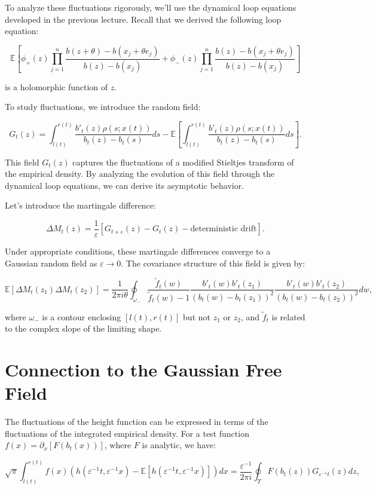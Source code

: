 \documentclass[letterpaper,11pt,oneside,reqno]{article}
\numberwithin{equation}{section}
\theoremstyle{definition}
\begin{document}
To analyze these fluctuations rigorously, we'll use the dynamical loop equations developed in the previous lecture. Recall that we derived the following loop equation:

$$\mathbb{E}\left[\phi_+(z) \prod_{j=1}^n \frac{b(z + \theta) - b(x_j + \theta e_j)}{b(z) - b(x_j)} + \phi_-(z) \prod_{j=1}^n \frac{b(z) - b(x_j + \theta e_j)}{b(z) - b(x_j)}\right]$$

is a holomorphic function of $z$.

To study fluctuations, we introduce the random field:

$$G_t(z) = \int_{l(t)}^{r(t)} \frac{b'_t(z)\rho(s; x(t))}{b_t(z) - b_t(s)}ds - \mathbb{E}\left[\int_{l(t)}^{r(t)} \frac{b'_t(z)\rho(s; x(t))}{b_t(z) - b_t(s)}ds\right].$$

This field $G_t(z)$ captures the fluctuations of a modified Stieltjes transform of the empirical density. By analyzing the evolution of this field through the dynamical loop equations, we can derive its asymptotic behavior.

Let's introduce the martingale difference:

$$\Delta M_t(z) = \frac{1}{\varepsilon}[G_{t+\varepsilon}(z) - G_t(z) - \text{deterministic drift}].$$

Under appropriate conditions, these martingale differences converge to a Gaussian random field as $\varepsilon \to 0$. The covariance structure of this field is given by:

$$\mathbb{E}[\Delta M_t(z_1)\Delta M_t(z_2)] = \frac{1}{2\pi i\theta} \oint_{\omega_-} \frac{\tilde{f}_t(w)}{\tilde{f}_t(w) - 1} \frac{b'_t(w)b'_t(z_1)}{(b_t(w) - b_t(z_1))^2} \frac{b'_t(w)b'_t(z_2)}{(b_t(w) - b_t(z_2))^2}dw,$$

where $\omega_-$ is a contour enclosing $[l(t), r(t)]$ but not $z_1$ or $z_2$, and $\tilde{f}_t$ is related to the complex slope of the limiting shape.

\section{Connection to the Gaussian Free Field}

The fluctuations of the height function can be expressed in terms of the fluctuations of the integrated empirical density. For a test function $f(x) = \partial_x[F(b_t(x))]$, where $F$ is analytic, we have:

$$\sqrt{\pi}\int_{l(t)}^{r(t)} f(x)(h(\varepsilon^{-1}t, \varepsilon^{-1}x) - \mathbb{E}[h(\varepsilon^{-1}t, \varepsilon^{-1}x)])dx = \frac{\varepsilon^{-1}}{2\pi i} \oint_{\Upsilon} F(b_t(z))G_{\varepsilon^{-1}t}(z)dz,$$
\end{document}
